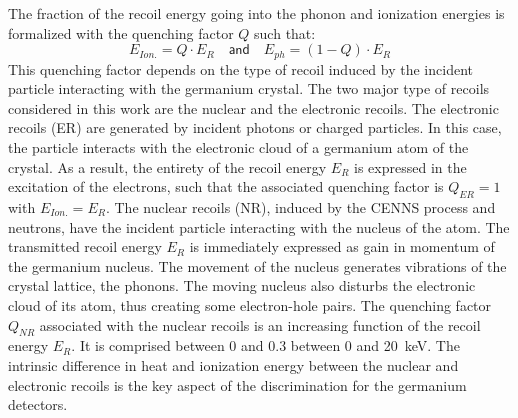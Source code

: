 The fraction of the recoil energy going into the phonon and ionization energies is formalized with the quenching factor $Q$ such that:
\begin{equation}
\label{eq:quenching-intro}
E_{Ion.} = Q \cdot E_R \quad \textsf{and} \quad E_{ph} = (1-Q) \cdot E_R
\end{equation}
This quenching factor depends on the type of recoil induced by the incident particle interacting with the germanium crystal. The two major type of recoils considered in this work are the nuclear and the electronic recoils.
The electronic recoils (ER) are generated by incident photons or charged particles. In this case, the particle interacts with the electronic cloud of a germanium atom of the crystal. As a result, the entirety of the recoil energy $E_R$ is expressed in the excitation of the electrons, such that the associated quenching factor is $Q_{ER} = 1$ with $E_{Ion.} = E_R$.
The nuclear recoils (NR), induced by the CENNS process and neutrons, have the incident particle interacting with the nucleus of the atom. The transmitted recoil energy $E_R$ is immediately expressed as gain in momentum of the germanium nucleus. The movement of the nucleus generates vibrations of the crystal lattice, the phonons. The moving nucleus also disturbs the electronic cloud of its atom, thus creating some electron-hole pairs. The quenching factor $Q_{NR}$ associated with the nuclear recoils is an increasing function of the recoil energy $E_R$. It is comprised between 0 and 0.3 between 0 and \SI{20}{\kilo\eV}.
The intrinsic difference in heat and ionization energy between the nuclear and electronic recoils is the key aspect of the discrimination for the germanium detectors.

